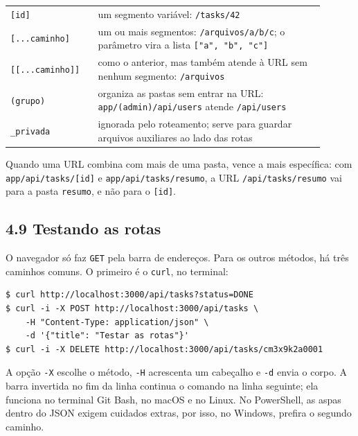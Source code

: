 \begin{center}
\begin{tabular}{@{}P{0.25\linewidth}P{0.65\linewidth}@{}}
\toprule
{}
 &  \\
\midrule
\texttt{[id]} & um segmento variável: \texttt{/tasks/42} \\
 \texttt{[...caminho]} & um ou mais segmentos: \texttt{/arquivos/a/b/c}; o parâmetro vira a lista \texttt{["a", "b", "c"]} \\
\texttt{[[...caminho]]} & como o anterior, mas também atende à URL sem nenhum segmento: \texttt{/arquivos} \\
 \texttt{(grupo)} & organiza as pastas sem entrar na URL: \texttt{app/(admin)/api/users} atende \texttt{/api/users} \\
\texttt{\_privada} & ignorada pelo roteamento; serve para guardar arquivos auxiliares ao lado das rotas \\
\bottomrule
\end{tabular}
\end{center}

Quando uma URL combina com mais de uma pasta, vence a mais específica: com \texttt{app/api/tasks/[id]} e \texttt{app/api/tasks/resumo}, a URL \texttt{/api/tasks/resumo} vai para a pasta \texttt{resumo}, e não para o \texttt{[id]}.

\subsection{4.9 Testando as rotas}

O navegador só faz \texttt{GET} pela barra de endereços. Para os outros métodos, há três caminhos comuns. O primeiro é o \texttt{curl}, no terminal:

\begin{codigo}
\begin{Verbatim}[breaklines=true, breaksymbolleft={}, fontsize=\footnotesize]
$ curl http://localhost:3000/api/tasks?status=DONE
$ curl -i -X POST http://localhost:3000/api/tasks \
    -H "Content-Type: application/json" \
    -d '{"title": "Testar as rotas"}'
$ curl -i -X DELETE http://localhost:3000/api/tasks/cm3x9k2a0001
\end{Verbatim}
\end{codigo}

A opção \texttt{-X} escolhe o método, \texttt{-H} acrescenta um cabeçalho e \texttt{-d} envia o corpo. A barra invertida no fim da linha continua o comando na linha seguinte; ela funciona no terminal Git Bash, no macOS e no Linux. No PowerShell, as aspas dentro do JSON exigem cuidados extras, por isso, no Windows, prefira o segundo caminho.

